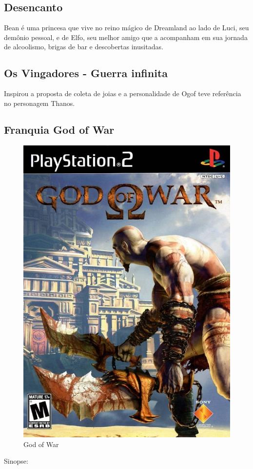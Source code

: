 \subsection{Desencanto}
Bean é uma princesa que vive no reino mágico de Dreamland ao lado de Luci, seu demônio pessoal, e de Elfo, seu melhor amigo que a acompanham em sua jornada de alcoolismo, brigas de bar e descobertas inusitadas.

\subsection{Os Vingadores - Guerra infinita}
Inspirou a proposta de coleta de joias e a personalidade de Ogof teve referência no personagem Thanos.

\subsection{Franquia God of War}

\begin{figure}[htb]
	\caption{\label{god_of_war}God of War}
	\begin{center}
	    \includegraphics[width=\textwidth/2]{imagens/GodofWar.jpg}
	\end{center}
\end{figure}
Sinopse:


